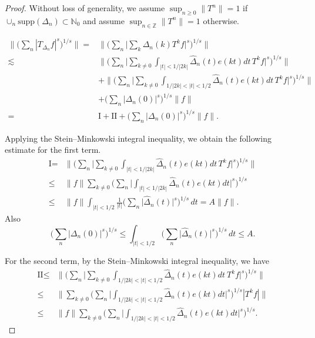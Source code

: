 \documentclass[11pt]{amsart}
\theoremstyle{definition}
\theoremstyle{remark}
\begin{document}
\begin{proof}
Without loss of generality, we assume $\sup_{n\ge 0} \lVert T^n \rVert = 1$ if $\cup_n \mbox{supp}(\Delta_n) \subset \mathbb N_0$ and  assume $\sup_{n\in \mathbb Z} \lVert T^n \rVert = 1$ otherwise.

\begin{align*}   \Big\lVert \Big( \sum_n |T_{\Delta_n}f|^s \Big)^{1/s} \Big\rVert
= & \Big\lVert \Big(\sum_n  \Big| \sum_k \Delta_n(k) T^kf\Big|^{s} \Big)^{1/s} \Big\rVert \\
\lesssim &   \Big\lVert   \Big( \sum_n  \Big|  \sum_{k\neq 0} \int_{|t|<1/|2k| } \hat \Delta_n(t) e(kt) dt  \,  T^kf \Big|^{s} \Big)^{1/s} \Big\rVert \\
 & +  \Big\lVert    \Big( \sum_n  \Big|  \sum_{k\neq 0}   \int_{1/|2k|<|t|<1/2} \hat \Delta_n(t) e(kt) dt  \,  T^kf \Big|^{s} \Big)^{1/s} \Big\rVert \\
& +     \Big( \sum_n  \Big|   \Delta_n(0)   \Big|^{s} \Big)^{1/s} \Big\lVert f \Big\rVert \\
 =  &  \mbox{I} + \mbox{II}+   \Big( \sum_n  \big|   \Delta_n(0)   \big|^{s} \Big)^{1/s} \Big\lVert f \Big\rVert.
\end{align*}



Applying the Stein--Minkowski integral inequality, we obtain the following estimate 
for the first term.
\begin{align*}
  \mbox{I} 
=  & \Big\lVert   \Big( \sum_n  \Big|  \sum_{k\neq 0} \int_{|t|<1/|2k|} \hat \Delta_n(t) e(kt) dt  \,  T^kf\Big|^{s} \Big)^{1/s} \Big\rVert \\
\le &  \lVert f\rVert \sum_{k\neq 0} \Big( \sum_n \Big|   \int_{|t|<1/ |2k| } \hat \Delta_n(t) e(kt) dt   \Big|^{s} \Big)^{1/s}\\
\le &   \lVert f\rVert \int_{|t|<1/2} \frac1{|t|}  \Big( \sum_n  \Big| \hat \Delta_n(t) \Big|^s \Big)^{1/s}  \, dt
= A \lVert f\rVert.
  \end{align*}
  Also 
\[ \Big( \sum_n  \big|   \Delta_n(0)   \big|^{s} \Big)^{1/s} \le  \int_{|t|<1/2} \Big( \sum_n  \Big| \hat \Delta_n(t) \Big|^s \Big)^{1/s}  \, dt
\le A.\]

For the second term, by the Stein--Minkowski integral inequality, we have
\begin{align*}
\mbox{II} \le & \Big\lVert   \Big( \sum_n  \Big|  \sum_{k\neq 0}   \int_{1/|2k| <|t|<1/2} \hat \Delta_n(t) e(kt) dt  \  T^kf \Big|^{s} \Big)^{1/s} \Big\rVert \\
\le & \Big\lVert  \sum_{k\neq 0}  \Big( \sum_n  \Big |  \int_{1/|2k|<|t|<1/2} \hat \Delta_n(t) e(kt) dt \Big |^s \Big)^{1/s} |T^kf | \Big\rVert\\
\le & \lVert f\rVert  \sum_{k\neq 0}  \Big( \sum_n  \Big |  \int_{1/|2k|<|t|<1/2} \hat \Delta_n(t) e(kt) dt \Big |^s \Big)^{1/s}.
\end{align*}


\end{proof}
\end{document}
